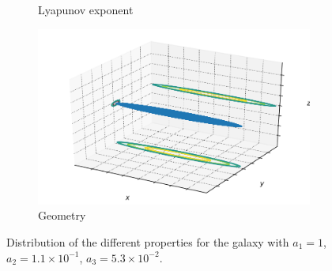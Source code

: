 \begin{figure}[h]
\begin{subfigure}[t]{0.4\textwidth}
        \caption{Lyapunov exponent}
    \end{subfigure}
    \begin{subfigure}[t]{0.4\textwidth}
        \includegraphics[width=\textwidth]{"../Files/Week 13/images/4_ellipsoid"}
        \caption{Geometry}
    \end{subfigure}
    \caption{Distribution of the different properties for the galaxy with $a_1 = 1$, $a_2 = 1.1\times10^{-1}$, $a_3 = 5.3\times10^{-2}$.}
\end{figure}


